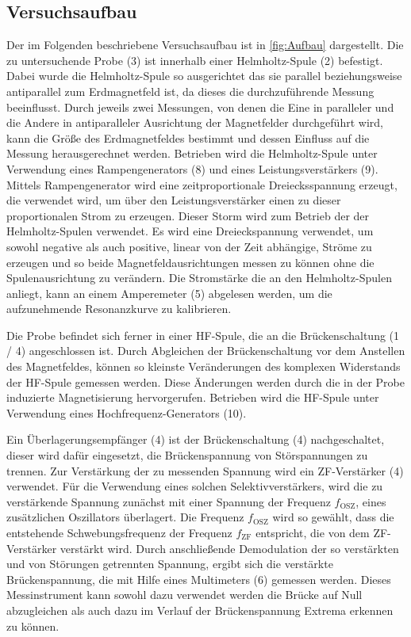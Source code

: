 \subsection{Versuchsaufbau}

Der im Folgenden beschriebene Versuchsaufbau ist in \cref{fig:Aufbau} dargestellt.
Die zu untersuchende Probe (3) ist innerhalb einer Helmholtz-Spule (2) befestigt. Dabei wurde die Helmholtz-Spule so 
ausgerichtet das sie parallel beziehungsweise antiparallel zum Erdmagnetfeld ist, da dieses die durchzuführende 
Messung beeinflusst. Durch jeweils zwei Messungen, von denen die Eine in paralleler und die Andere in antiparalleler Ausrichtung der Magnetfelder durchgeführt wird, kann die Größe des Erdmagnetfeldes bestimmt und dessen Einfluss auf die Messung herausgerechnet werden.
Betrieben wird die Helmholtz-Spule unter Verwendung eines Rampengenerators (8) und eines Leistungsverstärkers (9). Mittels Rampengenerator
wird eine zeitproportionale Dreiecksspannung erzeugt, die verwendet wird, um über den Leistungsverstärker einen zu dieser proportionalen Strom
zu erzeugen. Dieser Storm wird zum Betrieb der der Helmholtz-Spulen verwendet. Es wird eine Dreieckspannung verwendet, um sowohl negative 
als auch positive, linear von der Zeit abhängige, Ströme zu erzeugen und so beide Magnetfeldausrichtungen messen zu können ohne die 
Spulenausrichtung zu verändern. Die Stromstärke die an den Helmholtz-Spulen anliegt, kann an einem Amperemeter (5) abgelesen werden,
um die aufzunehmende Resonanzkurve zu kalibrieren.

Die Probe befindet sich ferner in einer HF-Spule, die an die Brückenschaltung (1 / 4) angeschlossen ist. Durch Abgleichen der Brückenschaltung 
vor dem Anstellen des Magnetfeldes, können so kleinste Veränderungen des komplexen Widerstands der HF-Spule gemessen werden. Diese Änderungen 
werden durch die in der Probe induzierte Magnetisierung hervorgerufen.
Betrieben wird die HF-Spule unter Verwendung eines Hochfrequenz-Generators (10). 

Ein Überlagerungsempfänger (4) ist der Brückenschaltung (4) nachgeschaltet, dieser wird
dafür eingesetzt, die Brückenspannung von Störspannungen zu trennen. Zur Verstärkung der zu messenden Spannung wird ein ZF-Verstärker (4)
verwendet. Für die Verwendung eines solchen Selektivverstärkers, wird die zu verstärkende Spannung zunächst mit einer Spannung der Frequenz 
$f_{\text{OSZ}}$, eines zusätzlichen Oszillators überlagert. Die Frequenz $f_{\text{OSZ}}$ wird so gewählt, dass die entstehende 
Schwebungsfrequenz der Frequenz $f_{\text{ZF}}$ entspricht, die von dem ZF-Verstärker verstärkt wird. Durch anschließende Demodulation der so 
verstärkten und von Störungen getrennten 
Spannung, ergibt sich die verstärkte Brückenspannung, die mit Hilfe eines Multimeters (6) gemessen werden. Dieses
Messinstrument kann sowohl dazu verwendet werden die Brücke auf Null abzugleichen als auch dazu im Verlauf der Brückenspannung Extrema erkennen zu können.

